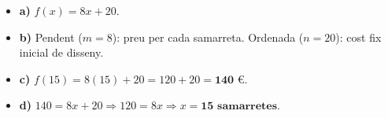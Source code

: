 \documentclass[12pt,a4paper]{exam}
\begin{document}
\begin{questions}
\begin{solution}
\begin{itemize}
    \item \textbf{a)} $f(x) = 8x + 20$.
    \item \textbf{b)} Pendent ($m=8$): preu per cada samarreta. Ordenada ($n=20$): cost fix inicial de disseny.
    \item \textbf{c)} $f(15) = 8(15) + 20 = 120 + 20 = \textbf{140 €}$.
    \item \textbf{d)} $140 = 8x + 20 \Rightarrow 120 = 8x \Rightarrow x = \textbf{15 samarretes}$.
\end{itemize}
\end{solution}


\end{questions}
\end{document}

